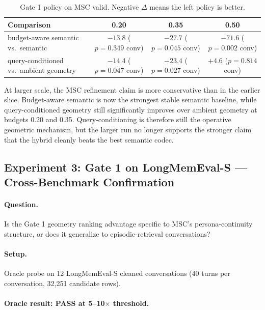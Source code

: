 \documentclass[conference]{IEEEtran}
\begin{document}
\begin{table}[t]
  \centering
  \caption{Gate 1 policy on MSC valid. Negative $\Delta$ means the left policy
  is better.}
  \label{tab:gate1_policy}
  \begin{tabular}{lccc}
    \toprule
    Comparison & 0.20 & 0.35 & 0.50 \\
    \midrule
    budget-aware semantic vs.\ semantic & $-13.8$ ($p{=}0.349$ conv) & $-27.7$ ($p{=}0.045$ conv) & $-71.6$ ($p{=}0.002$ conv) \\
    query-conditioned vs.\ ambient geometry & $-14.4$ ($p{=}0.047$ conv) & $-23.4$ ($p{=}0.027$ conv) & $+4.6$ ($p{=}0.814$ conv) \\
    \bottomrule
  \end{tabular}
\end{table}

At larger scale, the MSC refinement claim is more conservative than in the
earlier slice. Budget-aware semantic is now the strongest stable semantic
baseline, while query-conditioned geometry still significantly improves over
ambient geometry at budgets 0.20 and 0.35. Query-conditioning is therefore
still the operative geometric mechanism, but the larger run no longer supports
the stronger claim that the hybrid cleanly beats the best semantic codec.

\subsection{Experiment 3: Gate 1 on LongMemEval-S --- Cross-Benchmark Confirmation}
\label{sec:gate1_lme}

\paragraph{Question.} Is the Gate 1 geometry ranking advantage specific to
MSC's persona-continuity structure, or does it generalize to episodic-retrieval
conversations?

\paragraph{Setup.} Oracle probe on 12 LongMemEval-S cleaned conversations
(40 turns per conversation, 32{,}251 candidate rows).

\paragraph{Oracle result: PASS at 5--10$\times$ threshold.}
\end{document}
